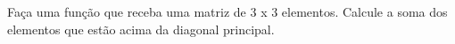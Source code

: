 
\question[10]

Faça uma função que receba uma matriz de 3 x 3 elementos. Calcule a soma dos elementos que estão acima da diagonal principal.
